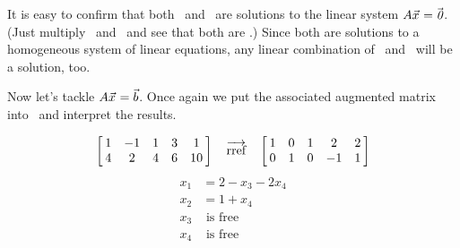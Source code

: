 {It is easy to confirm that both \vu\ and \vv\ are solutions to the linear system $\tta\vx=\zero$. (Just multiply \tta\vu\ and \tta\vv\ and see that both are \zero.) Since both are solutions to a homogeneous system of linear equations, any linear combination of \vu\ and \vv\ will be a solution, too. \\

\drawexampleline%

Now let's tackle $\tta\vx = \vb$. Once again we put the associated augmented matrix into \rref\ and interpret the results.

$$\bmx{ccccc}1&-1&1&3&1\\4&2&4&6&10\emx \quad \arref \quad \bmx{ccccc}1&0&1&2&2\\0&1&0&-1&1\emx$$
\begin{align*} x_1&=2-x_3-2x_4\\x_2 &= 1+x_4\\ x_3&\text{ is free}\\x_4&\text{ is 
free} \end{align*} 


}

